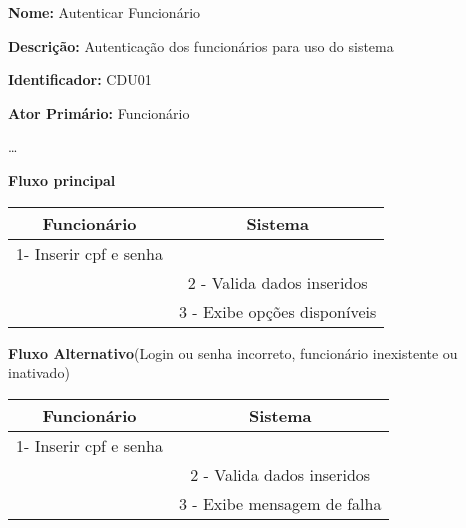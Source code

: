 	\par
	\textbf{Nome:} Autenticar Funcionário 
	\par
	\textbf{Descrição:} Autenticação dos funcionários para uso do sistema
	\par 
	\textbf{Identificador:} CDU01
	\par
	\textbf{Ator Primário:} Funcionário	
	\par
	\ldots
	\par
	\textbf{Fluxo principal}\par
	\begin{tabular}{|c|c|}
		\hline 
		Funcionário & Sistema \\ 
		\hline 
		1- Inserir cpf e senha  &  \\ 
		\hline 
		& 
		
		2 - Valida dados inseridos 
		\\ 
		\hline 
		& 
		
		3 - Exibe opções disponíveis
		\\ 
		\hline 
	\end{tabular} 
	\vspace{12px}
	\par
	\textbf{Fluxo Alternativo}(Login ou senha incorreto, funcionário inexistente ou inativado)\par
	\begin{tabular}{|c|c|}
		\hline 
		Funcionário & Sistema \\ 
		\hline 
		1- Inserir cpf e senha  &  \\ 
		\hline 
		& 
		
		2 - Valida dados inseridos 
		\\ 
		\hline 
		& 
		
		3 - Exibe mensagem de falha		
		\\ 
		\hline 
	\end{tabular} 
	\vspace{12px}

